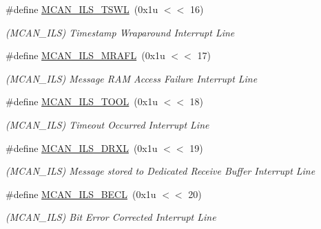 \begin{DoxyCompactItemize}
\mbox{\label{group__SAMV71__MCAN_ga526b5c77f17720e339d0506aad1464cf}} 
\#define \mbox{\hyperlink{group__SAMV71__MCAN_ga526b5c77f17720e339d0506aad1464cf}{M\+C\+A\+N\+\_\+\+I\+L\+S\+\_\+\+T\+S\+WL}}~(0x1u $<$$<$ 16)
\begin{DoxyCompactList}\small\item\em (M\+C\+A\+N\+\_\+\+I\+LS) Timestamp Wraparound Interrupt Line \end{DoxyCompactList}\item 
\mbox{\label{group__SAMV71__MCAN_gaecb4cdda7323e542873162438dc38e7e}} 
\#define \mbox{\hyperlink{group__SAMV71__MCAN_gaecb4cdda7323e542873162438dc38e7e}{M\+C\+A\+N\+\_\+\+I\+L\+S\+\_\+\+M\+R\+A\+FL}}~(0x1u $<$$<$ 17)
\begin{DoxyCompactList}\small\item\em (M\+C\+A\+N\+\_\+\+I\+LS) Message R\+AM Access Failure Interrupt Line \end{DoxyCompactList}\item 
\mbox{\label{group__SAMV71__MCAN_ga50afdf2a87b4027bacb8934e3f3a87e9}} 
\#define \mbox{\hyperlink{group__SAMV71__MCAN_ga50afdf2a87b4027bacb8934e3f3a87e9}{M\+C\+A\+N\+\_\+\+I\+L\+S\+\_\+\+T\+O\+OL}}~(0x1u $<$$<$ 18)
\begin{DoxyCompactList}\small\item\em (M\+C\+A\+N\+\_\+\+I\+LS) Timeout Occurred Interrupt Line \end{DoxyCompactList}\item 
\mbox{\label{group__SAMV71__MCAN_ga9f9b83f851b085275f5e017b41dd608e}} 
\#define \mbox{\hyperlink{group__SAMV71__MCAN_ga9f9b83f851b085275f5e017b41dd608e}{M\+C\+A\+N\+\_\+\+I\+L\+S\+\_\+\+D\+R\+XL}}~(0x1u $<$$<$ 19)
\begin{DoxyCompactList}\small\item\em (M\+C\+A\+N\+\_\+\+I\+LS) Message stored to Dedicated Receive Buffer Interrupt Line \end{DoxyCompactList}\item 
\mbox{\label{group__SAMV71__MCAN_ga318276854d4b19b1b4460b7a65968bf1}} 
\#define \mbox{\hyperlink{group__SAMV71__MCAN_ga318276854d4b19b1b4460b7a65968bf1}{M\+C\+A\+N\+\_\+\+I\+L\+S\+\_\+\+B\+E\+CL}}~(0x1u $<$$<$ 20)
\begin{DoxyCompactList}\small\item\em (M\+C\+A\+N\+\_\+\+I\+LS) Bit Error Corrected Interrupt Line \end{DoxyCompactList}\item 
$$
\end{DoxyCompactItemize}
